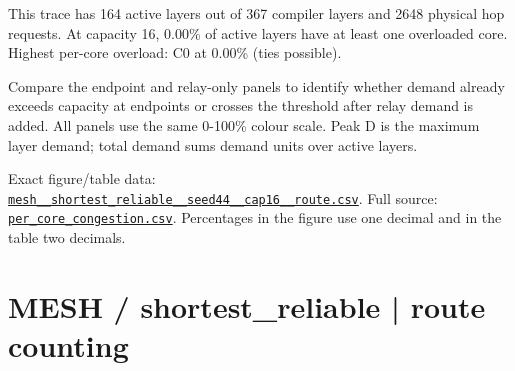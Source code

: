 \documentclass[10pt,a4paper]{article}
\begin{document}
This trace has 164 active layers out of 367 compiler layers and 2648 physical hop requests. At capacity 16, 0.00\% of active layers have at least one overloaded core. Highest per-core overload: C0 at 0.00\% (ties possible).\par
Compare the endpoint and relay-only panels to identify whether demand already exceeds capacity at endpoints or crosses the threshold after relay demand is added. All panels use the same 0-100\% colour scale. Peak D is the maximum layer demand; total demand sums demand units over active layers.\par
Exact figure/table data: \href{\detokenize{file:///home/dhruv-pansuriya/Documents/BTP/Compiler-Driven-ACE/output/pdf/qaoa_methods_congestion/tables/mesh__shortest_reliable__seed44__cap16__route.csv}}{\nolinkurl{mesh__shortest_reliable__seed44__cap16__route.csv}}. Full source: \href{\detokenize{file:///home/dhruv-pansuriya/Documents/BTP/Compiler-Driven-ACE/results/qaoa_2seed_2026-10-26/congestion/per_core_congestion.csv}}{\nolinkurl{per_core_congestion.csv}}. Percentages in the figure use one decimal and in the table two decimals.\par
\clearpage
\section*{MESH / shortest\_reliable | route counting}
\end{document}
